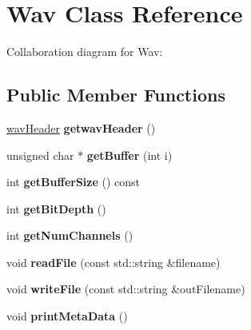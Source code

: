 \hypertarget{classWav}{}\section{Wav Class Reference}
\label{classWav}


Collaboration diagram for Wav\+:
\subsection*{Public Member Functions}
\begin{DoxyCompactItemize}
\item 
\mbox{\label{classWav_a5e521ff6da3e7a3ed546d948a125847f}} 
\hyperlink{structwavHeader}{wav\+Header} {\bfseries getwav\+Header} ()
\item 
\mbox{\label{classWav_ab1074c8c389a6dbea588c9791a9e1659}} 
unsigned char $\ast$ {\bfseries get\+Buffer} (int i)
\item 
\mbox{\label{classWav_a71fdfa1d9f5e7c1b86f07bbff4249dca}} 
int {\bfseries get\+Buffer\+Size} () const
\item 
\mbox{\label{classWav_afbd5588a3621503ee028fbec055fd075}} 
int {\bfseries get\+Bit\+Depth} ()
\item 
\mbox{\label{classWav_abfc3c1b6afed8bfc43a17cbd76f8a809}} 
int {\bfseries get\+Num\+Channels} ()
\item 
\mbox{\label{classWav_a8dbfa6c6dc4d8a0df92b0e4cb49d0133}} 
void {\bfseries read\+File} (const std\+::string \&filename)
\item 
\mbox{\label{classWav_a3e4d48579d4c83afb0519ac8492af6d0}} 
void {\bfseries write\+File} (const std\+::string \&out\+Filename)
\item 
\mbox{\label{classWav_a0c2edef046548025b4b22e70ddcc2728}} 
void {\bfseries print\+Meta\+Data} ()
\end{DoxyCompactItemize}
